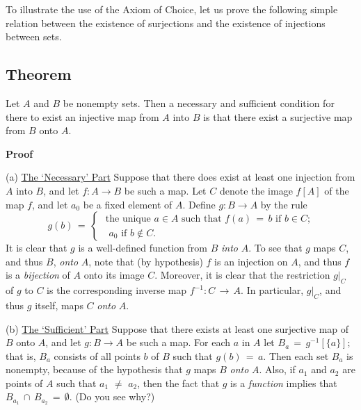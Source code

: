 {\V
\V
    
         To illustrate the use of the Axiom of Choice, let us prove the following simple relation between the existence of surjections and the existence of injections between sets.

\V

        \subsection{\small{{\bf Theorem}}}

        Let $A$ and $B$ be nonempty sets. Then a necessary and sufficient condition for there to exist an injective map from $A$ into $B$ is that there exist a surjective map from $B$ onto $A$.

\V

        {\bf Proof}\, 

\V

        (a) \underline{The `Necessary' Part} Suppose that there does exist at least one injection from $A$ into $B$,
    and let $f:A{\rightarrow}B$ be such a map.
    Let $C$ denote the image $f[A]$ of the map $f$, and let $a_{0}$ be a fixed element of $A$.
    Define $g:B{\rightarrow}A$ by the rule
        \begin{displaymath}
        g(b) \,=\,
                      \left\{
    \begin{array}{l}
\mbox{ the unique $a{\in}A$ such that $f(a) \,=\, b$ if $b{\in}C$;} \\
    \mbox{ $a_{0}$ if $b \not \in C$.}
    \end{array}
    \right.
        \end{displaymath}
    It is clear that $g$ is a well-defined function from $B$ {\em into} $A$. To see that $g$ maps $C$, and thus $B$, {\em onto} $A$,
    note that (by hypothesis) $f$ is an injection on $A$, and thus $f$ is a {\em bijection} of $A$ onto its image $C$.
    Moreover, it is clear that the restriction $g|_{C}$ of $g$ to $C$ is the corresponding inverse map $f^{-1}:C \,{\rightarrow}\, A$.
    In particular, $g|_{C}$, and thus $g$ itself, maps $C$ {\em onto} $A$.

\V

        (b) \underline{The `Sufficient' Part} Suppose that there exists at least one surjective map of $B$ onto $A$, and let $g:B{\rightarrow}A$ be such a map.
    For each $a$ in $A$ let $B_{a} \,=\, g^{-1}[\{a\}]$; that is, $B_{a}$ consists of all points $b$ of $B$ such that $g(b) \,=\, a$.
    Then each set $B_{a}$ is nonempty, because of the hypothesis that $g$ maps $B$ {\em onto} $A$. Also, if $a_{1}$ and $a_{2}$ are points of $A$ such that $a_{1} \,\,{\neq}\,\, a_{2}$, then the fact that $g$ is a  {\em function} implies that $B_{a_{1}}\,{\cap}\,B_{a_{2}} \,=\, {\emptyset}$. (Do you see why?)
 
}

